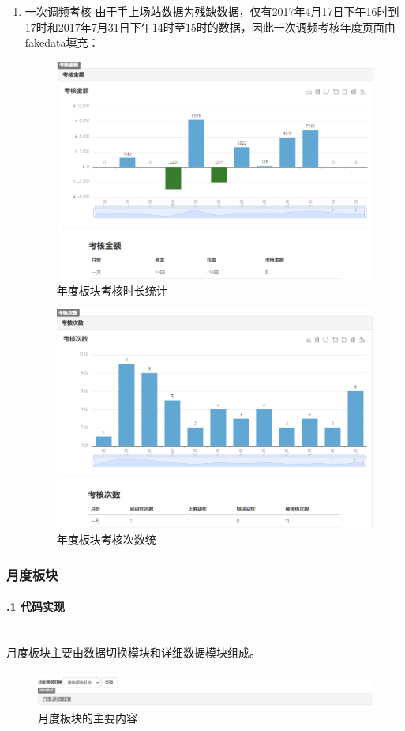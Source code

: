 \documentclass[winfonts,UTF8,a4paper]{ctexart}
\begin{document}
\begin{enumerate}
	\item 一次调频考核
	由于手上场站数据为残缺数据，仅有2017年4月17日下午16时到17时和2017年7月31日下午14时至15时的数据，因此一次调频考核年度页面由fakedata填充：
	\begin{figure}[H]
		\centering
		\includegraphics[width=0.7\linewidth]{pic/一次调频年度页面1}
		\caption{年度板块考核时长统计	}
		\label{fig:1}
	\end{figure}
	\begin{figure}[H]
		\centering
		\includegraphics[width=0.7\linewidth]{pic/一次调频年度页面2}
		\caption{年度板块考核次数统}
		\label{fig:2}
	\end{figure}
	
\end{enumerate}



\subsubsection{月度板块}\label{monthbankuai}
\paragraph{\thesubsubsection.1 代码实现}\ \\
月度板块主要由数据切换模块和详细数据模块组成。
\begin{figure}[H]
	\centering
	\includegraphics[width=0.7\linewidth]{pic/screenshot010}
	\caption{月度板块的主要内容}
	\label{fig:screenshot010}
\end{figure}
\end{document}
